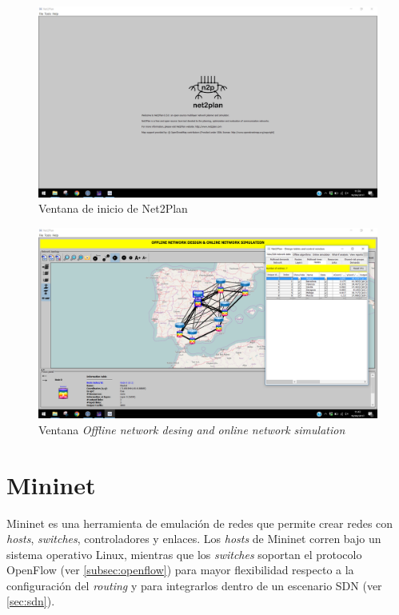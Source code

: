 \begin{figure}[ht!]
	\centering
	\includegraphics[width=1\linewidth]{imagenes/n2p_inicio}
	\caption{Ventana de inicio de Net2Plan}
	\label{fig:n2p_inicio}
\end{figure}
\begin{figure}[ht!]
	\centering
	\includegraphics[width=1\linewidth]{imagenes/n2p_redes}
	\caption{Ventana \textit{Offline network desing and online network simulation}}
	\label{fig:n2p_redes}
\end{figure}
\clearpage

\section{Mininet}
\label{sec:mininet}

Mininet es una herramienta de emulación de redes que permite crear redes con \textit{hosts}, \textit{switches}, controladores y enlaces. Los \textit{hosts} de Mininet corren bajo un sistema operativo Linux, mientras que los \textit{switches} soportan el protocolo OpenFlow (ver \ref{subsec:openflow}) para mayor flexibilidad respecto a la configuración del \textit{routing} y para integrarlos dentro de un escenario SDN (ver \ref{sec:sdn}).

